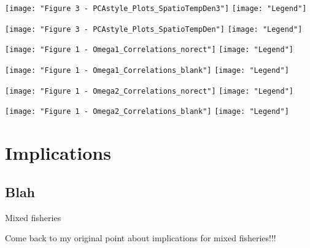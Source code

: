 \documentclass[xcolor=x11names,compress]{beamer}
\renewcommand{\(}{\begin{columns}}
\renewcommand{\)}{\end{columns}}
\newcommand{\<}[1]{\begin{column}{#1}}
\renewcommand{\>}{\end{column}}
\begin{document}
\begin{frame}{}
\centering
\texttt{[image: "Figure 3 - PCAstyle\_Plots\_SpatioTempDen3"]}
\texttt{[image: "Legend"]}
\end{frame}

\begin{frame}{}

\centering
\texttt{[image: "Figure 3 - PCAstyle\_Plots\_SpatioTempDen"]}
\texttt{[image: "Legend"]}
\end{frame}

\begin{frame}{}
\centering
\texttt{[image: "Figure 1 - Omega1\_Correlations\_norect"]}
\texttt{[image: "Legend"]}
\end{frame}

\begin{frame}{}
\centering
\texttt{[image: "Figure 1 - Omega1\_Correlations\_blank"]}
\texttt{[image: "Legend"]}
\end{frame}

\begin{frame}{}
\centering
\texttt{[image: "Figure 1 - Omega2\_Correlations\_norect"]}
\texttt{[image: "Legend"]}
\end{frame}

\begin{frame}{}
\centering
\texttt{[image: "Figure 1 - Omega2\_Correlations\_blank"]}
\texttt{[image: "Legend"]}
\end{frame}


\section{Implications}
\subsection{Blah}

\begin{frame}{Mixed fisheries}
	
Come back to my original point about implications for mixed fisheries!!!

\end{frame}
\end{document}
